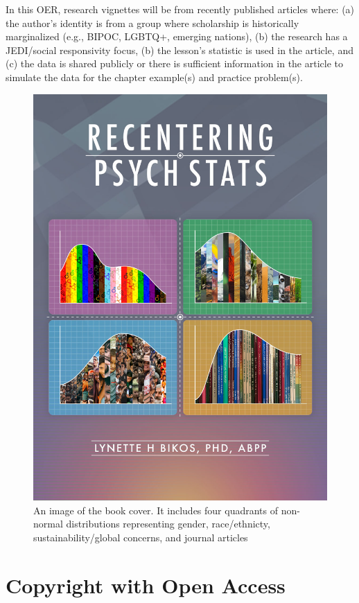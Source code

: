 \documentclass[
  english,
]{book}
\begin{document}
In this OER, research vignettes will be from recently published articles where: (a) the author's identity is from a group where scholarship is historically marginalized (e.g., BIPOC, LGBTQ+, emerging nations), (b) the research has a JEDI/social responsivity focus, (b) the lesson's statistic is used in the article, and (c) the data is shared publicly or there is sufficient information in the article to simulate the data for the chapter example(s) and practice problem(s).

\begin{figure}
\centering
\includegraphics{images/ReCenter_bookcover.jpg}
\caption{An image of the book cover. It includes four quadrants of non-normal distributions representing gender, race/ethnicty, sustainability/global concerns, and journal articles}
\end{figure}

\hypertarget{copyright-with-open-access}{%
\section*{Copyright with Open Access}\label{copyright-with-open-access}}
\end{document}

